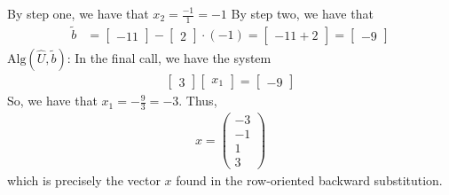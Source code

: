 \documentclass{report}
\begin{document}
    \bigbreak \noindent 
    By step one, we have that $x_{2} = \frac{-1}{1} =-1$
    \bigbreak \noindent 
    By step two, we have that
    \begin{align*}
        \tilde{b} &= \begin{bmatrix} -11 \end{bmatrix} - \begin{bmatrix} 2\end{bmatrix} \cdot (-1) = \begin{bmatrix}
           -11 + 2  
        \end{bmatrix}
        = 
        \begin{bmatrix}
            -9
        \end{bmatrix}
    \end{align*}
    $\text{Alg}(\hat{U}, \tilde{b})$: In the final call, we have  the system
    \begin{align*}
        \begin{bmatrix}
            3
        \end{bmatrix}
        \begin{bmatrix}
            x_{1}
        \end{bmatrix}
        = 
        \begin{bmatrix}
            -9
        \end{bmatrix}
    \end{align*}
    So, we have that $x_{1} = -\frac{9}{3} = -3$. Thus, 
    \begin{align*}
        x = \begin{pmatrix} -3 \\ -1 \\ 1 \\ 3 \end{pmatrix} 
    \end{align*}
    which is precisely the vector $x$ found in the row-oriented backward substitution.
\end{document}
